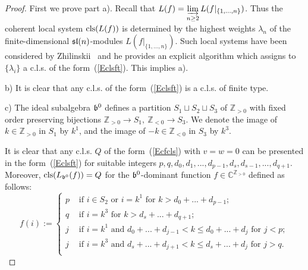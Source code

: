 \documentclass[10pt]{amsart}\oddsidemargin -1mm \evensidemargin -1mm \topmargin -15mm\headheight5mm \headsep 3.5mm \textheight 245mm\textwidth 170mm %
\theoremstyle{definition}\newtheorem{theorem}{Theorem}[section]\newtheorem{lemma}[theorem]{Lemma}\newtheorem{remark}[theorem]{Remark}\newtheorem{proposition}[theorem]{Proposition}\newtheorem{corollary}[theorem]{Corollary}\newtheorem{definition}[theorem]{Definition}\newtheorem{Ex}[theorem]{Example}
\begin{document}
\begin{proof}First we prove part a). Recall that $L(f)=\varinjlim\limits_{n\ge 2} L(f|_{\{1,..., n\}})$. Thus the coherent local system $\operatorname{\mathrm{cls}}(L(f))$ is determined by the highest weights $\lambda_n$ of the finite-dimensional $\frak{sl}(n)$-modules $L(f|_{\{1,..., n\}})$. Such local systems have been considered by Zhilinskii~\cite{Zh1} and he provides an explicit algorithm which assigns to $\{\lambda_i\}$ a c.l.s. of the form~(\ref{Eclsft}). This implies a).

b) It is clear that any c.l.s. of the form~(\ref{Eclsft}) is a c.l.s. of finite type.

c) The ideal subalgebra $\frak b^0$ defines a partition $S_1\sqcup S_2\sqcup S_3$ of $\mathbb Z_{>0}$ with fixed order preserving bijections $\mathbb Z_{>0}\to S_1,~\mathbb Z_{<0}\to S_3$. We denote the image of $k\in\mathbb Z_{>0}$ in $S_1$ by $k^1$, and the image of $-k\in\mathbb Z_{<0}$ in $S_3$ by $k^3$.


It is clear that any c.l.s. $Q$ of the form~(\ref{Ecfcls}) with $v=w=0$ can be presented in the form~(\ref{Eclsft}) for suitable integers $p, q, d_0, d_1,..., d_{p-1}, d_s, d_{s-1},..., d_{q+1}$. Moreover, $\operatorname{\mathrm{cls}}(L_{\frak b^0}(f))=Q$ for the $\frak b^0$-dominant function $f\in\mathbb C^{\mathbb Z_{>0}}$ defined as follows: $$f(i):=\begin{cases}p&\mbox{~if~}i\in S_2\mbox{~or~}i=k^1\mbox{~for~}k>d_0+...+d_{p-1};\\
q &\mbox{~if~}i=k^3\mbox{~for~}k>d_s+...+d_{q+1};\\
j &\mbox{~if~}i=k^1\mbox{~and~}d_0+...+d_{j-1}<k\le d_0+...+d_j\mbox{~for~}j<p;\\
j &\mbox{~if~}i=k^3\mbox{~and~}d_s+...+d_{j+1}<k\le d_s+...+d_j\mbox{~for~}j>q.\\
\end{cases}$$
\end{proof}
\end{document}
